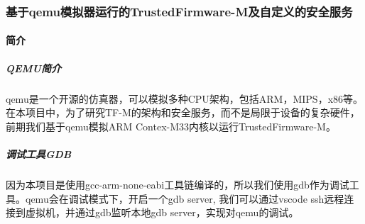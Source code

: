 \documentclass[12pt,a4paper]{ctexart}
\numberwithin{figure}{section}
\begin{document}
\subsubsection{基于qemu模拟器运行的TrustedFirmware-M及自定义的安全服务}
\paragraph{简介}
\subparagraph{QEMU简介}
\par qemu是一个开源的仿真器，可以模拟多种CPU架构，包括ARM，MIPS，x86等。在本项目中，为了研究TF-M的架构和安全服务，而不是局限于设备的复杂硬件，前期我们基于qemu模拟ARM Contex-M33内核以运行TrustedFirmware-M。
\subparagraph{调试工具GDB}
因为本项目是使用gcc-arm-none-eabi工具链编译的，所以我们使用gdb作为调试工具。qemu会在调试模式下，开启一个gdb server, 我们可以通过vscode ssh远程连接到虚拟机，并通过gdb监听本地gdb server，实现对qemu的调试。
\end{document}
